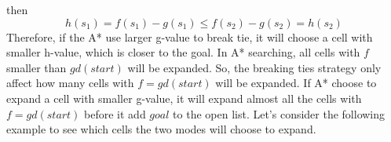 \documentclass[11pt]{article}
\begin{document}
then
	$$h(s_1) = f(s_1) - g(s_1)
	\leq f(s_2) - g(s_2)
	=h(s_2)$$ 
Therefore, if the A* use larger g-value to break tie, it will choose a cell with smaller h-value, which is closer to the goal. In A* searching, all cells with $f$ smaller than $gd(start)$ will be expanded. So, the breaking ties strategy only affect how many cells with $f = gd(start)$ will be expanded. If A* choose to expand a cell with smaller g-value, it will expand almost all the cells with $f = gd(start)$ before it add $goal$ to the open list.
Let's consider the following example to see which cells the two modes will choose to expand.
\end{document}
